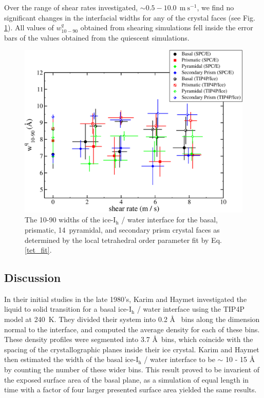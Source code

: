 Over the range of shear rates investigated,
$\sim 0.5-10.0~\mathrm{~m~s}^{-1}$, we find no significant changes in
the interfacial widths for any of the crystal faces (see Fig. \ref{fig:tetByShearRate}). All values of
$w_\mathrm{10-90}^{q}$ obtained from shearing simulations fell inside the
error bars of the values obtained from the quiescent simulations.

\begin{figure}[H]
\includegraphics[width=\linewidth]{Figures/tetByShearRate}
\caption{\label{fig:tetByShearRate}The 10-90 widths of the
  ice-I$_\mathrm{h}$ / water interface for the basal, prismatic,
  14\degree~pyramidal, and secondary prism crystal faces as determined
  by the local tetrahedral order parameter fit by
  Eq. \eqref{tet_fit}.}
\end{figure}


\subsection{Discussion}
In their initial studies in the late 1980's, Karim and Haymet
investigated the liquid to solid transition for a basal
ice-I$_\mathrm{h}$ / water interface using the TIP4P model at
240~K.\cite{Karim1987,Karim1988} They divided their system into 0.2
\AA~ bins along the dimension normal to the interface, and computed
the average density for each of these bins. These density profiles
were segmented into 3.7 \AA~bins, which coincide with the spacing of
the crystallographic planes inside their ice crystal. Karim and Haymet
then estimated the width of the basal ice-I$_\mathrm{h}$ / water
interface to be $\sim$ 10 - 15 \AA~ by counting the number of these
wider bins. This result proved to be invarient of the exposed surface
area of the basal plane, as a simulation of equal length in time with
a factor of four larger presented surface area yielded the same
results.

